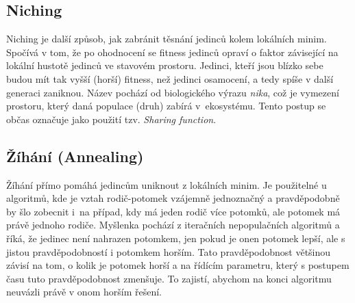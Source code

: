 \subsection{Niching}

Niching je další způsob, jak zabránit těsnání jedinců kolem lokálních minim. Spočívá v tom, že po ohodnocení se fitness jedinců opraví o faktor závisející na lokální hustotě jedinců ve stavovém prostoru. Jedinci, kteří jsou blízko sebe budou mít tak vyšší (horší) fitness, než jedinci osamocení, a tedy spíše v další generaci zaniknou. Název pochází od biologického výrazu \emph{nika}, což je vymezení prostoru, který daná populace (druh) zabírá v~ekosystému. Tento postup se občas označuje jako použití tzv. \emph{Sharing function}.

\subsection{Žíhání (Annealing)}

Žíhání přímo pomáhá jedincům uniknout z lokálních minim. Je použitelné u algoritmů, kde je vztah rodič-potomek vzájemně jednoznačný a pravděpodobně by šlo zobecnit i~na případ, kdy má jeden rodič více potomků, ale potomek má právě jednoho rodiče. Myšlenka pochází z iteračních nepopulačních algoritmů a říká, že jedinec není nahrazen potomkem, jen pokud je onen potomek lepší, ale s jistou pravděpodobností i potomkem horším. Tato pravděpodobnost většinou závisí na tom, o kolik je potomek horší a na řídícím parametru, který s postupem času tuto pravděpodobnost zmenšuje. To zajistí, abychom na konci algoritmu neuvázli právě v onom horším řešení.

